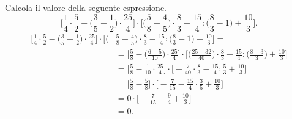 \begin{exrig}
\begin{esempio}
  Calcola il valore della seguente espressione.
\[\bigg[\frac{1}{4}\cdot\frac{5}{2}-\bigg(\frac{3}{5} - \frac{1}{2}\bigg)\cdot\frac{25}{4}\bigg]\cdot\bigg[\bigg(\frac{5}{8}-\frac{4}{5}\bigg)\cdot\frac{8}{3}-\frac{15}{4}:\bigg(\frac{8}{3}-1\bigg)+\frac{10}{3}\bigg].\]
  \begin{align*}
\bigg[\frac{1}{4}\cdot\frac{5}{2}-\bigg(\frac{3}{5} - \frac{1}{2}\bigg)\cdot\frac{25}{4}\bigg]\cdot\bigg[\bigg(&\frac{5}{8}-\frac{4}{5}\bigg)\cdot\frac{8}{3}-\frac{15}{4}:\bigg(\frac{8}{3}-1\bigg)+\frac{10}{3}\bigg]=\\
&=\bigg[\frac{5}{8}-\bigg(\frac{6-5}{10}\bigg)\cdot\frac{25}{4}\bigg]\cdot\bigg[\bigg(\frac{25-32}{40}\bigg)\cdot\frac{8}{3}-\frac{15}{4}:\bigg(\frac{8-3}{3}\bigg)+\frac{10}{3}\bigg]\\
&=\bigg[\frac{5}{8}-\frac{1}{10}\cdot\frac{25}{4}\bigg]\cdot\bigg[-\frac{7}{40}\cdot\frac{8}{3}-\frac{15}{4}:\frac{5}{3}+\frac{10}{3}\bigg]\\
&=\bigg[\frac{5}{8}-\frac{5}{8}\bigg]\cdot\bigg[-\frac{7}{15}-\frac{15}{4}\cdot\frac{3}{5}+\frac{10}{3}\bigg]\\
&=0\cdot\bigg[-\frac{7}{15}-\frac{9}{4}+\frac{10}{3}\bigg]\\
&=0.
  \end{align*}
\end{esempio}


\end{exrig}
